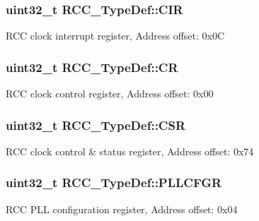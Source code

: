 \subsubsection[{\texorpdfstring{C\+IR}{CIR}}]{ uint32\+\_\+t R\+C\+C\+\_\+\+Type\+Def\+::\+C\+IR}\hypertarget{struct_r_c_c___type_def_aeadf3a69dd5795db4638f71938704ff0}{}\label{struct_r_c_c___type_def_aeadf3a69dd5795db4638f71938704ff0}
R\+CC clock interrupt register, Address offset\+: 0x0C 
\subsubsection[{\texorpdfstring{CR}{CR}}]{ uint32\+\_\+t R\+C\+C\+\_\+\+Type\+Def\+::\+CR}\hypertarget{struct_r_c_c___type_def_abcb9ff48b9afb990283fefad0554b5b3}{}\label{struct_r_c_c___type_def_abcb9ff48b9afb990283fefad0554b5b3}
R\+CC clock control register, Address offset\+: 0x00 
\subsubsection[{\texorpdfstring{C\+SR}{CSR}}]{ uint32\+\_\+t R\+C\+C\+\_\+\+Type\+Def\+::\+C\+SR}\hypertarget{struct_r_c_c___type_def_a7e913b8bf59d4351e1f3d19387bd05b9}{}\label{struct_r_c_c___type_def_a7e913b8bf59d4351e1f3d19387bd05b9}
R\+CC clock control \& status register, Address offset\+: 0x74 
\subsubsection[{\texorpdfstring{P\+L\+L\+C\+F\+GR}{PLLCFGR}}]{ uint32\+\_\+t R\+C\+C\+\_\+\+Type\+Def\+::\+P\+L\+L\+C\+F\+GR}\hypertarget{struct_r_c_c___type_def_a2a7ccb4e23cb05a574f243f6278b7b26}{}\label{struct_r_c_c___type_def_a2a7ccb4e23cb05a574f243f6278b7b26}
R\+CC P\+LL configuration register, Address offset\+: 0x04 
